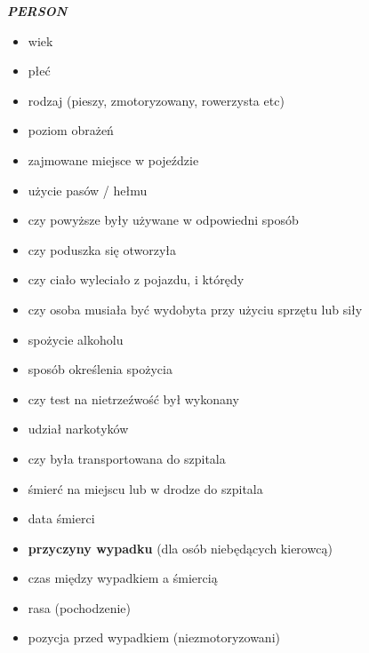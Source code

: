 \emph{\textbf{PERSON}}

\begin{itemize}
\itemsep-14pt\parskip0pt
\item
  wiek\\
\item
  płeć\\
\item
  rodzaj (pieszy, zmotoryzowany, rowerzysta etc)\\
\item
  poziom obrażeń\\
\item
  zajmowane miejsce w pojeździe\\
\item
  użycie pasów / hełmu\\
\item
  czy powyższe były używane w odpowiedni sposób\\
\item
  czy poduszka się otworzyła\\
\item
  czy ciało wyleciało z pojazdu, i którędy\\
\item
  czy osoba musiała być wydobyta przy użyciu sprzętu lub siły\\
\item
  spożycie alkoholu\\
\item
  sposób określenia spożycia\\
\item
  czy test na nietrzeźwość był wykonany\\
\item
  udział narkotyków\\
\item
  czy była transportowana do szpitala\\
\item
  śmierć na miejscu lub w drodze do szpitala\\
\item
  data śmierci\\
\item
  \textbf{przyczyny wypadku} (dla osób niebędących kierowcą)\\
\item
  czas między wypadkiem a śmiercią\\
\item
  rasa (pochodzenie)\\
\item
  pozycja przed wypadkiem (niezmotoryzowani)
\end{itemize}
